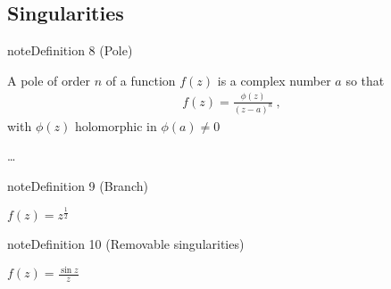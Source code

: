 \documentclass[letterpaper,10pt,english]{jupyterBook}
\begin{document}
\subsection{Singularities}
\label{\detokenize{ch/complex/analysis:singularities}}\label{\detokenize{ch/complex/analysis:complex-analysis-singularities}}\label{ch/complex/analysis:definition-2}
\begin{sphinxadmonition}{note}{Definition 8 (Pole)}



\sphinxAtStartPar
A pole of order \(n\) of a function \(f(z)\) is a complex number \(a\) so that
\begin{equation*}
\begin{split}f(z) = \frac{\phi(z)}{(z-a)^n} \ ,\end{split}
\end{equation*}
\sphinxAtStartPar
with \(\phi(z)\) holomorphic in \(\phi(a) \ne 0\)
\end{sphinxadmonition}

\sphinxAtStartPar
{} …
\label{ch/complex/analysis:definition-3}
\begin{sphinxadmonition}{note}{Definition 9 (Branch)}


\end{sphinxadmonition}

\sphinxAtStartPar
{} \(f(z) = z^{\frac{1}{2}}\)
\label{ch/complex/analysis:definition-4}
\begin{sphinxadmonition}{note}{Definition 10 (Removable singularities)}


\end{sphinxadmonition}

\sphinxAtStartPar
{} \(f(z) = \frac{\sin z}{z}\)

\sphinxAtStartPar
{}
\end{document}
